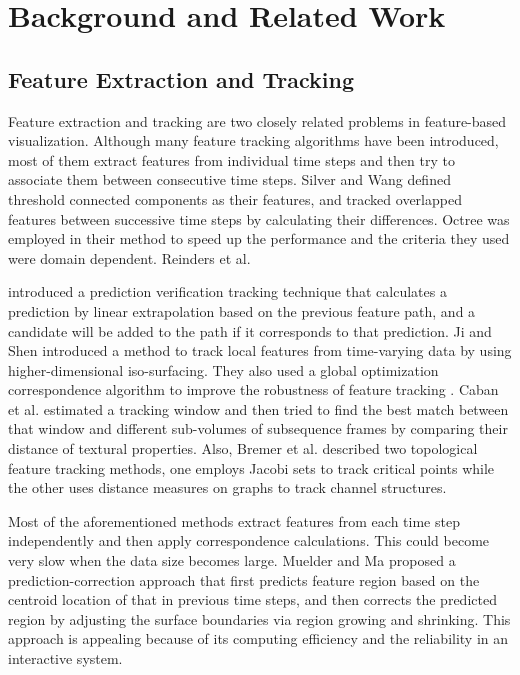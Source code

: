 \documentclass[10pt, conference, compsocconf]{IEEEtran}
\begin{document}
\section{Background and Related Work}

\subsection{Feature Extraction and Tracking}

Feature extraction and tracking are two closely related problems in feature-based visualization. Although many feature tracking algorithms have been introduced, most of them extract features from individual time steps and then try to associate them between consecutive time steps. Silver and Wang \cite{Silver1997} defined threshold connected components as their features, and tracked overlapped features between successive time steps by calculating their differences. Octree was employed in their method to speed up the performance and the criteria they used were domain dependent. Reinders et al. 

\cite{Reinders2001} introduced a prediction verification tracking technique that calculates a prediction by linear extrapolation based on the previous feature path, and a candidate will be added to the path if it corresponds to that prediction. Ji and Shen \cite{Ji2003} introduced a method to track local features from time-varying data by using higher-dimensional iso-surfacing. They also used a global optimization correspondence algorithm to improve the robustness of feature tracking \cite{Ji2006}. Caban et al. \cite{Caban2007} estimated a tracking window and then tried to find the best match between that window and different sub-volumes of subsequence frames by comparing their distance of textural properties. Also, Bremer et al. \cite{Bremer2007} described two topological feature tracking methods, one employs Jacobi sets to track critical points while the other uses distance measures on graphs to track channel structures.

Most of the aforementioned methods extract features from each time step independently and then apply correspondence calculations. This could become very slow when the data size becomes large. Muelder and Ma \cite{Muelder2009} proposed a prediction-correction approach that first predicts feature region based on the centroid location of that in previous time steps, and then corrects the predicted region by adjusting the surface boundaries via region growing and shrinking. This approach is appealing because of its computing efficiency and the reliability in an interactive system.
\end{document}
